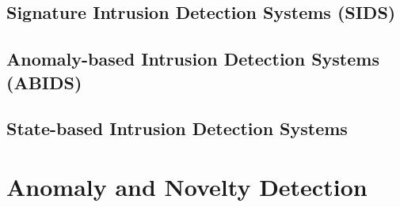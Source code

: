 	\subsection{Signature Intrusion Detection Systems (SIDS)}
	\subsection{Anomaly-based Intrusion Detection Systems (ABIDS)}
	\subsection{State-based Intrusion Detection Systems}

\section{Anomaly and Novelty Detection}

